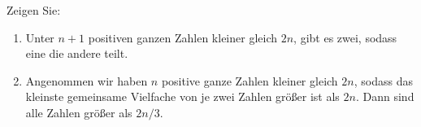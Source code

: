 
\begin{exercise}

Zeigen Sie:

\begin{enumerate}[label = (\alph*)]
    \item Unter $n+1$ positiven ganzen Zahlen kleiner gleich $2n$, gibt
    es zwei, sodass eine die andere teilt.
    \item Angenommen wir haben $n$ positive ganze Zahlen kleiner gleich $2n$,
    sodass das kleinste gemeinsame Vielfache von je zwei Zahlen größer ist als $2n$.
    Dann sind alle Zahlen größer als $2n/3$.
\end{enumerate}

\end{exercise}


\begin{solution}

\phantom{}

\end{solution}

